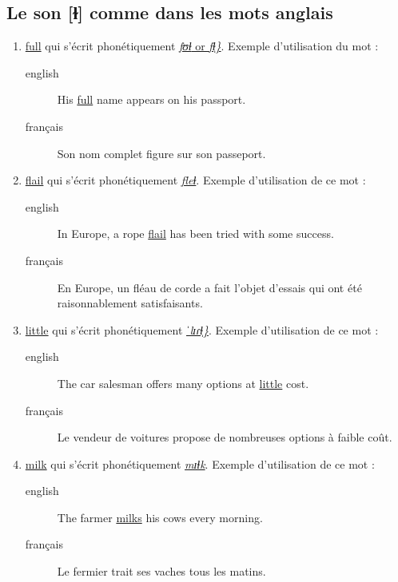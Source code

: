 \documentclass[12pt,a4paper]{book}
\begin{document}
\subsection{Le son [ɫ] comme dans les mots anglais}
\label{sec:org78aa354}
\begin{enumerate}
\item \href{http://www.wordreference.com/enfr/full}{full} qui s'écrit phonétiquement \href{https://home.cc.umanitoba.ca/\~krussll/phonetics/narrower/dark-l.html}{\emph{fʊɫ} or \emph{fɫ̩\}}}. Exemple
d'utilisation du mot :
\begin{description}
\item[{english}] \textenglish{His \href{https://youtu.be/TLmlgCteCMw}{full} name appears on his passport.}
\item[{français}] Son nom complet figure sur son passeport.
\end{description}
\item \href{http://www.wordreference.com/enfr/flail}{flail} qui s'écrit phonétiquement \href{https://home.cc.umanitoba.ca/\~krussll/phonetics/narrower/dark-l.html}{\emph{fleɫ}}. Exemple d'utilisation de
ce mot :
\begin{description}
\item[{english}] \textenglish{In Europe, a rope \href{https://youtu.be/AGf7n7iUF\_k}{flail} has been tried with some
success.}
\item[{français}] En Europe, un fléau de corde a fait l'objet d'essais
qui ont été raisonnablement satisfaisants.
\end{description}
\item \href{http://www.wordreference.com/enfr/little}{little} qui s'écrit phonétiquement \href{https://home.cc.umanitoba.ca/\~krussll/phonetics/narrower/dark-l.html}{\emph{ˈlɪɾɫ̩\}}}. Exemple d'utilisation
de ce mot :
\begin{description}
\item[{english}] \textenglish{The car salesman offers many options at \href{https://youtu.be/FokJGK639R4}{little} cost.}
\item[{français}] Le vendeur de voitures propose de nombreuses options à faible coût.
\end{description}
\item \href{http://www.wordreference.com/enfr/milk}{milk} qui s'écrit phonétiquement \href{https://home.cc.umanitoba.ca/\~krussll/phonetics/narrower/dark-l.html}{\emph{mɪɫk}}. Exemple d'utilisation de ce
mot :
\begin{description}
\item[{english}] \textenglish{The farmer \href{https://youtu.be/XBOE2CC0YYY}{milks} his cows every morning.}
\item[{français}] Le fermier trait ses vaches tous les matins.
\end{description}
\end{enumerate}
\end{document}
